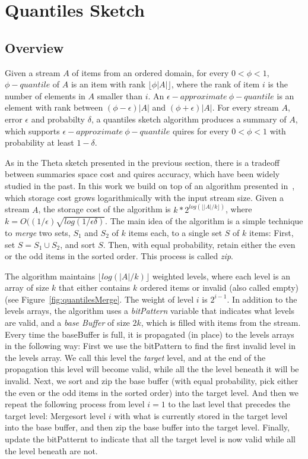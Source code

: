 \section{Quantiles Sketch}
\label{sec:quantiles}

\subsection{Overview}

Given a stream $A$ of items from an ordered domain, for every
$0< \phi < 1$, $\phi - quantile$ of $A$ is an item with rank 
$\lfloor \phi |A| \rfloor$, where the rank of item $i$ is the
number of elements in $A$ smaller than $i$.
An $\epsilon -approximate ~\phi - quantile$ is an element
with rank between $ (\phi - \epsilon) |A|$ and $ (\phi +
\epsilon) |A|$.
For every stream $A$, error $\epsilon$ and probabilty $\delta$,
a quantiles sketch algorithm produces a summary of $A$, which
supports $\epsilon -approximate ~\phi - quantile$ quires for
every $0< \phi < 1$ with probability
at least $1 - \delta$.

As in the Theta sketch presented in the previous section, there
is a tradeoff between summaries space cost and quires accuracy,
which have been widely studied in the past.
In this work we build on top of an algorithm presented
in~\cite{}, which storage cost grows logarithmically with the
input stream size.
Given a stream $A$, the storage cost of the algorithm is
$k*2^{log(\lfloor |A|/k \rfloor)}$, where $k = O((1/\epsilon)
\sqrt{log(1/\epsilon \delta)}$.
The main idea of the algorithm is a simple technique to
\emph{merge} two sets, $S_1$ and $S_2$ of $k$ items each, to a
single set $S$ of $k$ items:
First, set $S = S_1 \cup S_2$, and sort $S$. 
Then, with equal probability, retain either the even or the odd
items in the sorted order. 
This process is called \emph{zip}.


The algorithm maintains $\lfloor log(|A|/k) \rfloor$ weighted
levels, where each level is an array of size $k$ that either contains $k$ ordered
items or invalid (also called empty) (see Figure~\ref{fig:quantilesMerge}.
The weight of level $i$ is $2^{i-1}$.
In addition to the levels arrays, the algorithm uses a
\emph{bitPattern} variable that indicates what levels are valid,
and a \emph{base Buffer} of size $2k$, which is filled with items
from the stream.
Every time the baseBuffer is full, it is propagated (in place) to
the levels arrays in the following way:
First we use the bitPattern to find the first invalid level in
the levels array. 
We call this level the \emph{target} level, and at the end of
the propagation this level will become valid, while all the the
level beneath it will be invalid.
Next, we sort and zip the base buffer (with equal probability,
pick either the even or the odd items in the sorted order) into
the target level.
And then we repeat the following process from level $i=1$ to the
last level that precedes the target level:
Mergesort level $i$ with what is currently stored in the target
level into the base buffer, and then zip the base buffer into the
target level.
Finally, update the bitPatternt to indicate that all the target
level is now valid while all the level beneath are not.

